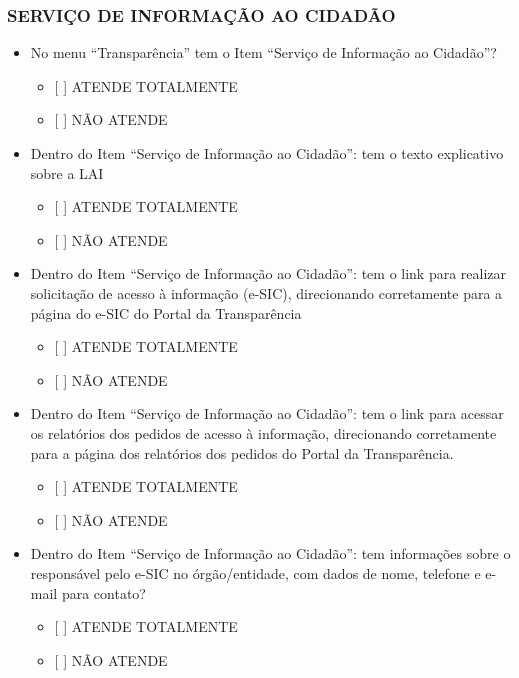 \documentclass[]{book}
\providecommand{\tightlist}{%
  \setlength{\itemsep}{0pt}\setlength{\parskip}{0pt}}
\begin{document}
\hypertarget{serviuxe7o-de-informauxe7uxe3o-ao-cidaduxe3o-1}{%
\subsubsection*{SERVIÇO DE INFORMAÇÃO AO CIDADÃO}\label{serviuxe7o-de-informauxe7uxe3o-ao-cidaduxe3o-1}}

\begin{itemize}
\tightlist
\item
  No menu ``Transparência'' tem o Item ``Serviço de Informação ao Cidadão''?

  \begin{itemize}
  \tightlist
  \item
    {[} {]} ATENDE TOTALMENTE
  \item
    {[} {]} NÃO ATENDE
  \end{itemize}
\item
  Dentro do Item ``Serviço de Informação ao Cidadão'': tem o texto explicativo sobre a LAI

  \begin{itemize}
  \tightlist
  \item
    {[} {]} ATENDE TOTALMENTE
  \item
    {[} {]} NÃO ATENDE
  \end{itemize}
\item
  Dentro do Item ``Serviço de Informação ao Cidadão'': tem o link para realizar solicitação de acesso à informação (e-SIC), direcionando corretamente para a página do e-SIC do Portal da Transparência

  \begin{itemize}
  \tightlist
  \item
    {[} {]} ATENDE TOTALMENTE
  \item
    {[} {]} NÃO ATENDE
  \end{itemize}
\item
  Dentro do Item ``Serviço de Informação ao Cidadão'': tem o link para acessar os relatórios dos pedidos de acesso à informação, direcionando corretamente para a página dos relatórios dos pedidos do Portal da Transparência.

  \begin{itemize}
  \tightlist
  \item
    {[} {]} ATENDE TOTALMENTE
  \item
    {[} {]} NÃO ATENDE
  \end{itemize}
\item
  Dentro do Item ``Serviço de Informação ao Cidadão'': tem informações sobre o responsável pelo e-SIC no órgão/entidade, com dados de nome, telefone e e-mail para contato?

  \begin{itemize}
  \tightlist
  \item
    {[} {]} ATENDE TOTALMENTE
  \item
    {[} {]} NÃO ATENDE
  \end{itemize}
\end{itemize}
\end{document}
